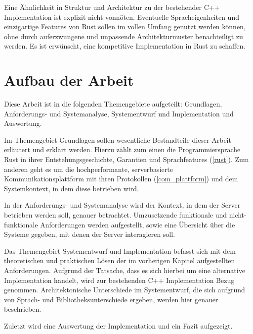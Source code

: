 Eine Ähnlichkeit in Struktur und Architektur zu der bestehender C++ Implementation ist explizit nicht vonnöten.
Eventuelle Spracheigenheiten und einzigartige Features von Rust sollen im vollen Umfang genutzt werden können, ohne durch auferzwungene und unpassende Architekturmuster benachteiligt zu werden.
Es ist erwünscht, eine kompetitive Implementation in Rust zu schaffen.


\section{Aufbau der Arbeit}

Diese Arbeit ist in die folgenden Themengebiete aufgeteilt: Grundlagen, Anforderungs- und Systemanalyse, Systementwurf und Implementation und Auswertung.

Im Themengebiet Grundlagen sollen wesentliche Bestandteile dieser Arbeit erläutert und erklärt werden.
Hierzu zählt zum einen die Programmiersprache Rust in ihrer Entstehungsgeschichte, Garantien  und Sprachfeatures  (\autoref{rust}).
Zum anderen geht es um die hochperformante, serverbasierte Kommunikationsplattform mit ihren Protokollen (\autoref{com_plattform}) und dem Systemkontext, in dem diese betrieben wird.

In der Anforderungs- und Systemanalyse wird der Kontext, in dem der Server betrieben werden soll, genauer betrachtet. Umzusetzende funktionale und nicht-funktionale Anforderungen werden aufgestellt, sowie eine Übersicht über die Systeme gegeben, mit denen der Server interagieren soll.

Das Themengebiet Systementwurf und Implementation befasst sich mit dem theoretischen und praktischen Lösen der im vorherigen Kapitel aufgestellten Anforderungen. Aufgrund der Tatsache, dass es sich hierbei
um eine alternative Implementation handelt, wird zur bestehenden C++ Implementation Bezug genommen.
Architektonische Unterschiede im Systementwurf, die sich aufgrund von Sprach- und Bibliotheksunterschiede ergeben, werden hier genauer beschrieben.

Zuletzt wird eine Auswertung der Implementation und ein Fazit aufgezeigt.
